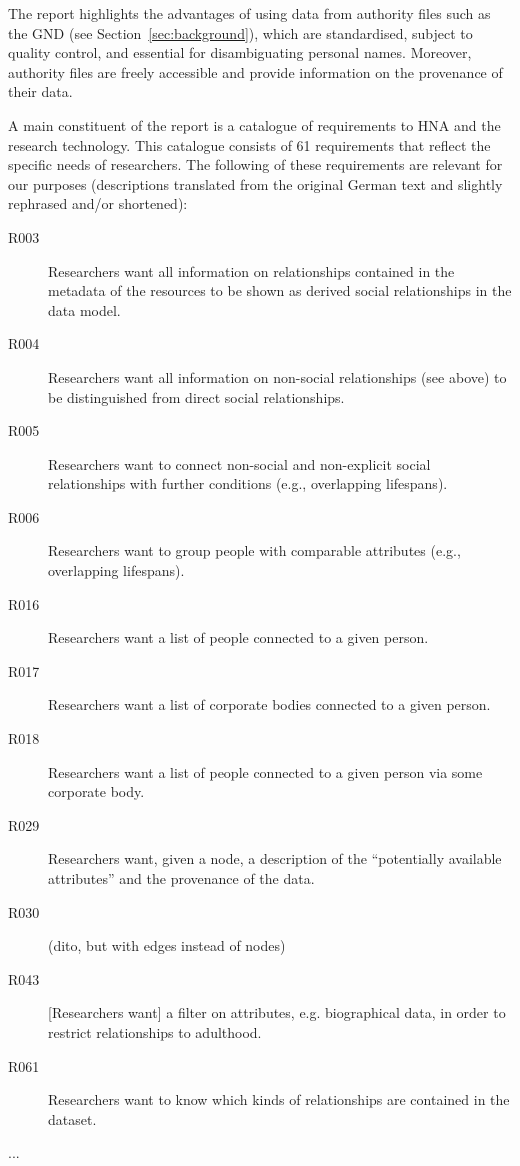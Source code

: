 The report highlights the advantages of using data from authority files
such as the GND (see Section~\ref{sec:background}), which are standardised,
subject to quality control, and essential for disambiguating personal names.
Moreover, authority files are freely accessible and provide information
on the provenance of their data.

A main constituent of the report is a catalogue of requirements
to HNA and the research technology. This catalogue consists of 61
requirements that reflect the specific needs of researchers.
The following of these requirements are relevant for our purposes
(descriptions translated from the original German text and slightly rephrased and/or shortened):
%
\begin{description}
  \item[R003]
    Researchers want all information on relationships contained in the metadata of the resources
    to be shown as derived social relationships in the data model.
  \item[R004]
    Researchers want all information on non-social
    relationships (see above) to be distinguished from direct social relationships.
  \item[R005]
    Researchers want to connect non-social and non-explicit social relationships
    with further conditions (e.g., overlapping lifespans).
  \item[R006]
    Researchers want to group people with comparable attributes (e.g., overlapping lifespans).
  \item[R016]
    Researchers want a list of people connected to a given person.
  \item[R017]
    Researchers want a list of corporate bodies connected to a given person.
  \item[R018]
    Researchers want a list of people connected to a given person via some corporate body.
  \item[R029]
    Researchers want, given a node, a description of the \enquote{potentially available attributes}
    and the provenance of the data.
  \item[R030]
    (dito, but with edges instead of nodes)
  \item[R043]
    [Researchers want] a filter on attributes, e.g. biographical data, in order to
    restrict relationships to adulthood.
  \item[R061]
    Researchers want to know which kinds of relationships are contained in the dataset.
  \item[...]
\end{description}



